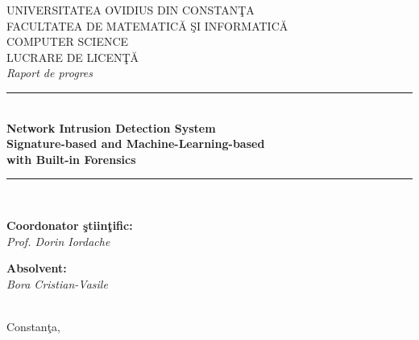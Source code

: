 \begin{titlepage}
\centering

\vspace*{1.0cm}
{\large\sffamily UNIVERSITATEA OVIDIUS DIN CONSTAN\c{T}A}\\[0.2cm]
{\large\sffamily FACULTATEA DE MATEMATIC\u{A} \c{S}I INFORMATIC\u{A}}\\[0.2cm]
{\large\sffamily COMPUTER SCIENCE}\\[3.0cm]

{\large\sffamily LUCRARE DE LICEN\c{T}\u{A}}\\
{\normalsize\sffamily \textit{Raport de progres}}\\[2.0cm]

\rule{0.85\textwidth}{0.6pt}\\[0.5cm]
{\Large\bfseries\sffamily
Network Intrusion Detection System\\[0.2cm]
Signature-based and Machine-Learning-based\\[0.2cm]
with Built-in Forensics\\}
\rule{0.85\textwidth}{0.6pt}\\[2.0cm]

\begin{minipage}{0.45\textwidth}
\begin{flushleft}\large
\textbf{Coordonator \c{s}tiin\c{t}ific:}\\
\textit{Prof. Dorin Iordache}\\
\end{flushleft}
\end{minipage}\hfill
\begin{minipage}{0.45\textwidth}
\begin{flushright}\large
\textbf{Absolvent:}\\
\textit{Bora Cristian-Vasile}\\
\end{flushright}
\end{minipage}\\[3.0cm]

\vfill
{\large Constan\c{t}a, \the\year}
\end{titlepage}

